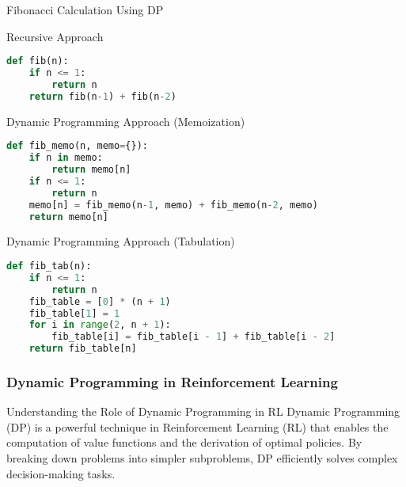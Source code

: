 \documentclass[aspectratio=169]{beamer}
\begin{document}
\begin{frame}[fragile]{Fibonacci Calculation Using DP}
    \begin{block}{Recursive Approach}
    \begin{lstlisting}[language=Python]
def fib(n):
    if n <= 1:
        return n
    return fib(n-1) + fib(n-2)
    \end{lstlisting}
    \end{block}

    \begin{block}{Dynamic Programming Approach (Memoization)}
    \begin{lstlisting}[language=Python]
def fib_memo(n, memo={}):
    if n in memo:
        return memo[n]
    if n <= 1:
        return n
    memo[n] = fib_memo(n-1, memo) + fib_memo(n-2, memo)
    return memo[n]
    \end{lstlisting}
    \end{block}

    \begin{block}{Dynamic Programming Approach (Tabulation)}
    \begin{lstlisting}[language=Python]
def fib_tab(n):
    if n <= 1:
        return n
    fib_table = [0] * (n + 1)
    fib_table[1] = 1
    for i in range(2, n + 1):
        fib_table[i] = fib_table[i - 1] + fib_table[i - 2]
    return fib_table[n]
    \end{lstlisting}
    \end{block}
\end{frame}

\begin{frame}[fragile]
  \frametitle{Dynamic Programming in Reinforcement Learning}
  \begin{block}{Understanding the Role of Dynamic Programming in RL}
    Dynamic Programming (DP) is a powerful technique in Reinforcement Learning (RL) that enables the computation of value functions and the derivation of optimal policies. By breaking down problems into simpler subproblems, DP efficiently solves complex decision-making tasks.
  \end{block}
\end{frame}
\end{document}
